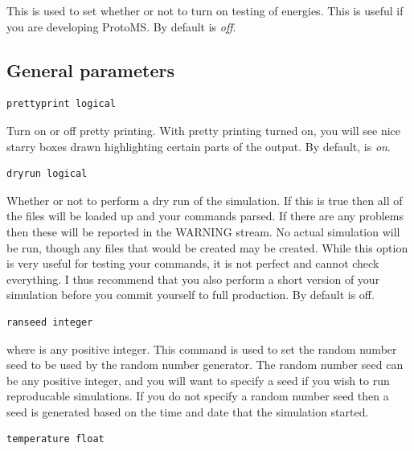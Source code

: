 \documentclass[letterpaper,10pt,english]{sphinxmanual}
\begin{document}
This is used to set whether or not to turn on testing of energies. This is useful if you are developing ProtoMS. By default  is \emph{off}.


\subsection{General parameters}
\label{protoms:general-parameters}
\begin{Verbatim}[frame=single,commandchars=\\\{\}]
prettyprint logical
\end{Verbatim}

Turn on or off pretty printing. With pretty printing turned on, you will see nice starry boxes drawn highlighting certain parts of the output. By default,  is \emph{on}.

\begin{Verbatim}[frame=single,commandchars=\\\{\}]
dryrun logical
\end{Verbatim}

Whether or not to perform a dry run of the simulation. If this is true then all of the files will be loaded up and your commands parsed. If there are any problems then these will be reported in the WARNING stream. No actual simulation will be run, though any files that would be created may be created. While this option is very useful for testing your commands, it is not perfect and cannot check everything. I thus recommend that you also perform a short version of your simulation before you commit yourself to full production. By default  is off.

\begin{Verbatim}[frame=single,commandchars=\\\{\}]
ranseed integer
\end{Verbatim}

where  is any positive integer. This command is used to set the random number seed to be used by the random number generator. The random number seed can be any positive integer, and you will want to specify a seed if you wish to run reproducable simulations. If you do not specify a random number seed then a seed is generated based on the time and date that the simulation started.

\begin{Verbatim}[frame=single,commandchars=\\\{\}]
temperature float
\end{Verbatim}
\end{document}
